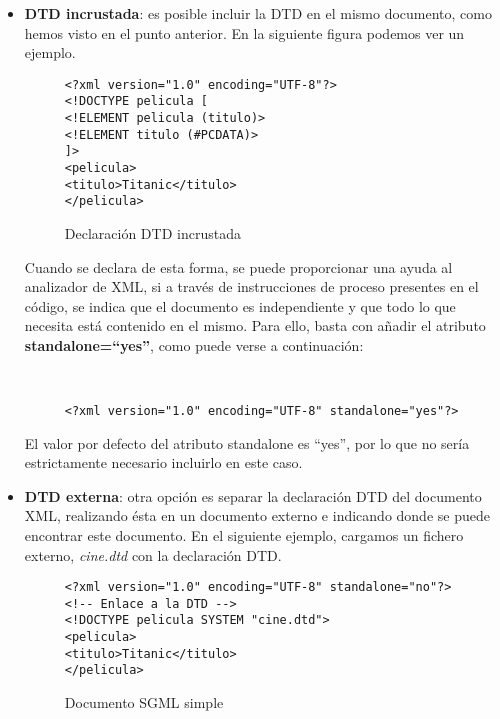 \begin{itemize}
    \item \textbf{DTD incrustada}: es posible incluir la DTD en el mismo documento, como hemos visto en el punto anterior. En la siguiente figura podemos ver un ejemplo.

    \begin{figure}[h]
        \begin{tcolorbox}[sharp corners, colback=yellow!30, colframe=white!20]
            \scriptsize
            \begin{verbatim}
<?xml version="1.0" encoding="UTF-8"?>
<!DOCTYPE pelicula [
<!ELEMENT pelicula (titulo)>
<!ELEMENT titulo (#PCDATA)>
]>
<pelicula>
<titulo>Titanic</titulo>
</pelicula>
            \end{verbatim}
        \end{tcolorbox}
        \caption{Declaración DTD incrustada}
    \end{figure}

    Cuando se declara de esta forma, se puede proporcionar una ayuda al analizador de XML, si a través de instrucciones de proceso presentes en el código, se indica que el documento es independiente y que todo lo que necesita está contenido en el mismo. Para ello, basta con añadir el atributo \textbf{standalone=``yes''}, como puede verse a continuación:

    \begin{figure}[h]
        \begin{tcolorbox}[sharp corners, colback=yellow!30, colframe=white!20]
            \scriptsize
            \begin{verbatim}


<?xml version="1.0" encoding="UTF-8" standalone="yes"?>
            \end{verbatim}
        \end{tcolorbox}
    \end{figure}

    El valor por defecto del atributo standalone es ``yes'', por lo que no sería estrictamente necesario incluirlo en este caso.

    \item \textbf{DTD externa}: otra opción es separar la declaración DTD del documento XML, realizando ésta en un documento externo e indicando donde se puede encontrar este documento. En el siguiente ejemplo, cargamos un fichero externo, \textit{cine.dtd} con la declaración DTD.

    \begin{figure}[h]
        \begin{tcolorbox}[sharp corners, colback=yellow!30, colframe=white!20]
            \scriptsize
            \begin{verbatim}
<?xml version="1.0" encoding="UTF-8" standalone="no"?> <!-- Enlace a la DTD -->
<!DOCTYPE pelicula SYSTEM "cine.dtd">
<pelicula>
<titulo>Titanic</titulo>
</pelicula>
            \end{verbatim}
        \end{tcolorbox}
        \caption{Documento SGML simple}
    \end{figure}
\end{itemize}

